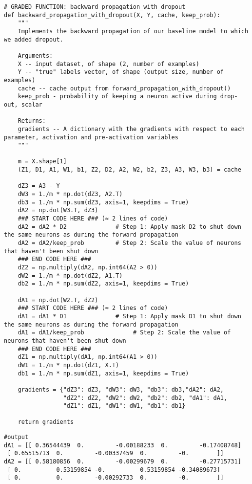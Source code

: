 \begin{verbatim}
# GRADED FUNCTION: backward_propagation_with_dropout
def backward_propagation_with_dropout(X, Y, cache, keep_prob):
    """
    Implements the backward propagation of our baseline model to which we added dropout.
    
    Arguments:
    X -- input dataset, of shape (2, number of examples)
    Y -- "true" labels vector, of shape (output size, number of examples)
    cache -- cache output from forward_propagation_with_dropout()
    keep_prob - probability of keeping a neuron active during drop-out, scalar
    
    Returns:
    gradients -- A dictionary with the gradients with respect to each parameter, activation and pre-activation variables
    """
    
    m = X.shape[1]
    (Z1, D1, A1, W1, b1, Z2, D2, A2, W2, b2, Z3, A3, W3, b3) = cache
    
    dZ3 = A3 - Y
    dW3 = 1./m * np.dot(dZ3, A2.T)
    db3 = 1./m * np.sum(dZ3, axis=1, keepdims = True)
    dA2 = np.dot(W3.T, dZ3)
    ### START CODE HERE ### (≈ 2 lines of code)
    dA2 = dA2 * D2              # Step 1: Apply mask D2 to shut down the same neurons as during the forward propagation
    dA2 = dA2/keep_prob         # Step 2: Scale the value of neurons that haven't been shut down
    ### END CODE HERE ###
    dZ2 = np.multiply(dA2, np.int64(A2 > 0))
    dW2 = 1./m * np.dot(dZ2, A1.T)
    db2 = 1./m * np.sum(dZ2, axis=1, keepdims = True)
    
    dA1 = np.dot(W2.T, dZ2)
    ### START CODE HERE ### (≈ 2 lines of code)
    dA1 = dA1 * D1              # Step 1: Apply mask D1 to shut down the same neurons as during the forward propagation
    dA1 = dA1/keep_prob              # Step 2: Scale the value of neurons that haven't been shut down
    ### END CODE HERE ###
    dZ1 = np.multiply(dA1, np.int64(A1 > 0))
    dW1 = 1./m * np.dot(dZ1, X.T)
    db1 = 1./m * np.sum(dZ1, axis=1, keepdims = True)
    
    gradients = {"dZ3": dZ3, "dW3": dW3, "db3": db3,"dA2": dA2,
                 "dZ2": dZ2, "dW2": dW2, "db2": db2, "dA1": dA1, 
                 "dZ1": dZ1, "dW1": dW1, "db1": db1}
    
    return gradients
\end{verbatim}

\begin{verbatim}
#output
dA1 = [[ 0.36544439  0.         -0.00188233  0.         -0.17408748]
 [ 0.65515713  0.         -0.00337459  0.         -0.        ]]
dA2 = [[ 0.58180856  0.         -0.00299679  0.         -0.27715731]
 [ 0.          0.53159854 -0.          0.53159854 -0.34089673]
 [ 0.          0.         -0.00292733  0.         -0.        ]]

\end{verbatim}

